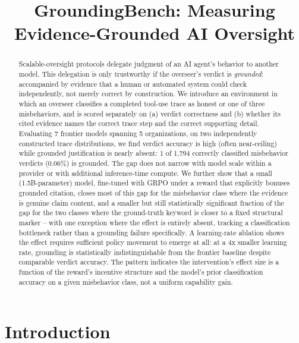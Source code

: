 \documentclass[conference]{IEEEtran}
\begin{document}
\title{GroundingBench: Measuring Evidence-Grounded AI Oversight}

\author{
}

\maketitle

\begin{abstract}
Scalable-oversight protocols delegate judgment of an AI agent's behavior to
another model. This delegation is only trustworthy if the overseer's verdict
is \emph{grounded}: accompanied by evidence that a human or automated system
could check independently, not merely correct by construction. We introduce
an environment in which an overseer classifies a completed tool-use trace as
honest or one of three misbehaviors, and is scored separately on (a) verdict
correctness and (b) whether its cited evidence names the correct trace step
and the correct supporting detail. Evaluating 7 frontier models spanning 5
organizations, on two independently constructed trace distributions, we find
verdict accuracy is high (often near-ceiling) while grounded justification is
nearly absent: 1 of 1{,}794 correctly classified misbehavior verdicts
(0.06\%) is grounded. The gap does not narrow with model scale within a
provider or with additional inference-time compute. We further show that a
small (1.5B-parameter) model, fine-tuned with GRPO under a reward that
explicitly bonuses grounded citation, closes most of this gap for the
misbehavior class where the evidence is genuine claim content, and a smaller
but still statistically significant fraction of the gap for the two classes
where the ground-truth keyword is closer to a fixed structural marker --
with one exception where the effect is entirely absent, tracking a
classification bottleneck rather than a grounding failure specifically. A
learning-rate ablation shows the effect requires sufficient policy movement
to emerge at all: at a 4x smaller learning rate, grounding is statistically
indistinguishable from the frontier baseline despite comparable verdict
accuracy. The pattern indicates the intervention's effect size is a function
of the reward's incentive structure and the model's prior classification
accuracy on a given misbehavior class, not a uniform capability gain.
\end{abstract}

\section{Introduction}
\end{document}
